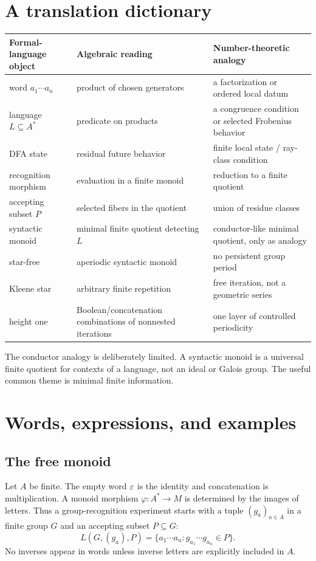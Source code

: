 \documentclass{amsart}
\begin{document}
\section{A translation dictionary}

\begin{center}
\begin{tabularx}{0.96\textwidth}{@{}lXX@{}}
\toprule
Formal-language object & Algebraic reading & Number-theoretic analogy\\
\midrule
word $a_1\cdots a_n$ & product of chosen generators & a factorization or ordered local datum\\
language $L\subseteq A^\ast$ & predicate on products & a congruence condition or selected Frobenius behavior\\
DFA state & residual future behavior & finite local state / ray-class condition\\
recognition morphism & evaluation in a finite monoid & reduction to a finite quotient\\
accepting subset $P$ & selected fibers in the quotient & union of residue classes\\
syntactic monoid & minimal finite quotient detecting $L$ & conductor-like minimal quotient, only as analogy\\
star-free & aperiodic syntactic monoid & no persistent group period\\
Kleene star & arbitrary finite repetition & free iteration, not a geometric series\\
height one & Boolean/concatenation combinations of nonnested iterations & one layer of controlled periodicity\\
\bottomrule
\end{tabularx}
\end{center}

The conductor analogy is deliberately limited.  A syntactic monoid is a universal finite quotient for contexts of a language, not an ideal or Galois group.  The useful common theme is minimal finite information.

\section{Words, expressions, and examples}

\subsection{The free monoid}

Let $A$ be finite.  The empty word $\varepsilon$ is the identity and concatenation is multiplication.  A monoid morphism $\varphi:A^\ast\to M$ is determined by the images of letters.  Thus a group-recognition experiment starts with a tuple $(g_a)_{a\in A}$ in a finite group $G$ and an accepting subset $P\subseteq G$:
\[
  L(G,(g_a),P)=\{a_1\cdots a_n:g_{a_1}\cdots g_{a_n}\in P\}.
\]
No inverses appear in words unless inverse letters are explicitly included in $A$.
\end{document}
